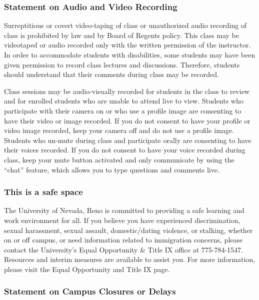 \documentclass[
]{article}
\begin{document}
\subsubsection{Statement on Audio and Video
Recording}\label{statement-on-audio-and-video-recording}

Surreptitious or covert video-taping of class or unauthorized audio
recording of class is prohibited by law and by Board of Regents policy.
This class may be videotaped or audio recorded only with the written
permission of the instructor. In order to accommodate students with
disabilities, some students may have been given permission to record
class lectures and discussions. Therefore, students should understand
that their comments during class may be recorded.

Class sessions may be audio-visually recorded for students in the class
to review and for enrolled students who are unable to attend live to
view. Students who participate with their camera on or who use a profile
image are consenting to have their video or image recorded. If you do
not consent to have your profile or video image recorded, keep your
camera off and do not use a profile image. Students who un-mute during
class and participate orally are consenting to have their voices
recorded. If you do not consent to have your voice recorded during
class, keep your mute button activated and only communicate by using the
``chat'' feature, which allows you to type questions and comments live.

\subsubsection{This is a safe space}\label{this-is-a-safe-space}

The University of Nevada, Reno is committed to providing a safe learning
and work environment for all. If you believe you have experienced
discrimination, sexual harassment, sexual assault, domestic/dating
violence, or stalking, whether on or off campus, or need information
related to immigration concerns, please contact the University's Equal
Opportunity \& Title IX office at 775-784-1547. Resources and interim
measures are available to assist you. For more information, please visit
the Equal Opportunity and Title IX page.

\subsubsection{Statement on Campus Closures or
Delays}\label{statement-on-campus-closures-or-delays}
\end{document}
